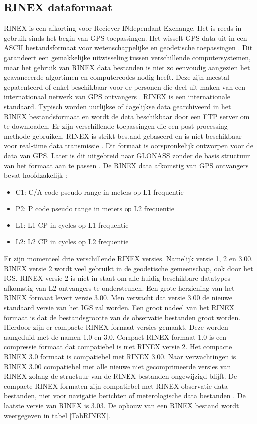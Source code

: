 \subsection{RINEX dataformaat}
\label{LRin}
RINEX is een afkorting voor Reciever INdependant Exchange. Het is reeds in gebruik sinds het begin van GPS toepassingen. Het wisselt GPS data uit in een ASCII bestandsformaat voor wetenschappelijke en geodetische toepassingen \cite{LBibRTCM}. Dit garandeert een gemakkelijke uitwisseling tussen verschillende computersystemen, maar het gebruik van RINEX data bestanden is niet zo eenvoudig aangezien het geavanceerde algortimen en computercodes nodig heeft. Deze zijn meestal gepatenteerd of enkel beschikbaar voor de personen die deel uit maken van een internationaal netwerk van GPS ontvangers \cite{LBibGPS5}. RINEX is een internationale standaard. Typisch worden uurlijkse of dagelijkse data gearchiveerd in het RINEX bestandsformaat en wordt de data beschikbaar door een FTP server om te downloaden. Er zijn verschillende toepassingen die een post-processing methode gebruiken. RINEX is strikt bestand gebaseerd en is niet beschikbaar voor real-time data transmissie \cite{LBibRTCM}. Dit formaat is oorspronkelijk ontworpen voor de data van GPS. Later is dit uitgebreid naar GLONASS zonder de basis structuur van het formaat aan te passen \cite{LBibRINEX}. De RINEX data afkomstig van GPS ontvangers bevat hoofdzakelijk \cite{LBibGPS5}:
\begin{itemize}
	\item C1: C/A code pseudo range in meters op L1 frequentie
	\item P2: P code pseudo range in meters op L2 frequentie
	\item L1: L1 CP in cycles op L1 frequentie
	\item L2: L2 CP in cycles op L2 frequentie
\end{itemize}
 Er zijn momenteel drie verschillende RINEX versies. Namelijk versie 1, 2 en 3.00. RINEX versie  2 wordt veel gebruikt in de geodetische gemeenschap, ook door het IGS. RINEX versie 2 is niet in staat om alle huidig beschikbare datatypes afkomstig van L2 ontvangers te ondersteunen. Een grote herziening van het RINEX formaat levert versie 3.00. Men verwacht dat versie 3.00 de nieuwe standaard versie van het IGS zal worden. Een groot nadeel van het RINEX formaat is dat de bestandsgrootte van de observatie bestanden groot worden. Hierdoor zijn er compacte RINEX formaat versies gemaakt. Deze worden aangeduid met de namen 1.0 en 3.0. Compact RINEX formaat 1.0 is een compressie formaat dat compatiebel is met RINEX versie 2. Het compacte RINEX 3.0 formaat is compatiebel met RINEX 3.00. Naar verwachtingen is RINEX 3.00 compatiebel met alle nieuwe niet gecomprimeerde versies van RINEX zolang de structuur van de RINEX bestanden ongewijzigd blijft.  De compacte RINEX formaten zijn compatiebel met RINEX observatie data bestanden, niet voor navigatie berichten of meterologische data bestanden \cite{LBibRINEX}. De laatste versie van RINEX is 3.03. De opbouw van een RINEX bestand wordt weergegeven in tabel \ref{TabRINEX}.
 
